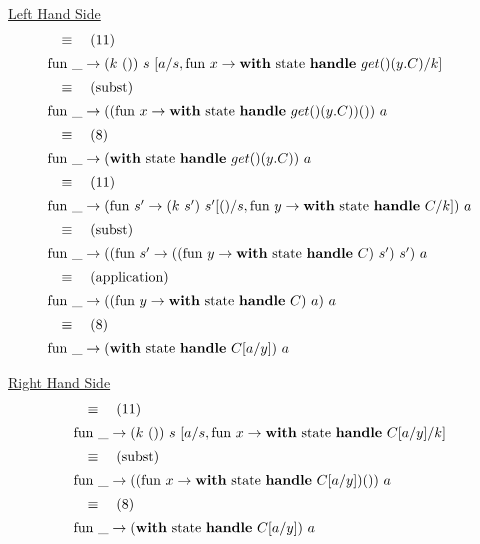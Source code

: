 \documentclass[logo,bsc,singlespacing,parskip]{infthesis}
\begin{document}
\underline{Left Hand Side}
\[ 
\begin{array}{l}
\quad\equiv\quad (11) \\[5pt]
\text{fun }\_ \rightarrow (k\ ())\ s\ [a/s, \text{fun } x \rightarrow \text{\textbf{with} state \textbf{handle} } get() (y. C)/k] \\[5pt]
\quad\equiv\quad (\text{subst}) \\[5pt]
\text{fun }\_ \rightarrow ((\text{fun } x \rightarrow \text{\textbf{with} state \textbf{handle} } get() (y. C)) ())\ a \\[5pt]
\quad\equiv\quad (8) \\[5pt]
\text{fun }\_ \rightarrow (\text{\textbf{with} state \textbf{handle} } get() (y. C))\ a \\[5pt]
\quad\equiv\quad (11) \\[5pt]
\text{fun }\_ \rightarrow (\text{fun } s' \rightarrow  (k\ s')\ s' [()/s, \text{fun } y \rightarrow \text{\textbf{with} state \textbf{handle} } C / k])\ a \\[5pt]
\quad\equiv\quad (\text{subst}) \\[5pt]
\text{fun }\_ \rightarrow ((\text{fun } s' \rightarrow ((\text{fun } y \rightarrow \text{\textbf{with} state \textbf{handle} } C)\ s' )\ s')\ a \\[5pt]
\quad\equiv\quad (\text{application}) \\[5pt]
\text{fun }\_ \rightarrow ((\text{fun } y \rightarrow \text{\textbf{with} state \textbf{handle} } C)\ a )\ a \\[5pt]
\quad\equiv\quad (8) \\[5pt]
\text{fun }\_ \rightarrow (\text{\textbf{with} state \textbf{handle} } C[a/y])\ a
\end{array}
\]

\underline{Right Hand Side}
\[ 
\begin{array}{l}
\quad\equiv\quad (11) \\[5pt]
\text{fun }\_ \rightarrow (k\ ())\ s\ [a/s, \text{fun } x \rightarrow \text{\textbf{with} state \textbf{handle} } C[a/y]/k] \\[5pt]
\quad\equiv\quad (\text{subst}) \\[5pt]
\text{fun }\_ \rightarrow ((\text{fun } x \rightarrow \text{\textbf{with} state \textbf{handle} } C[a/y]) ())\ a \\[5pt]
\quad\equiv\quad (8) \\[5pt]
\text{fun }\_ \rightarrow (\text{\textbf{with} state \textbf{handle} } C[a/y])\ a
\end{array}
\]
\end{document}
